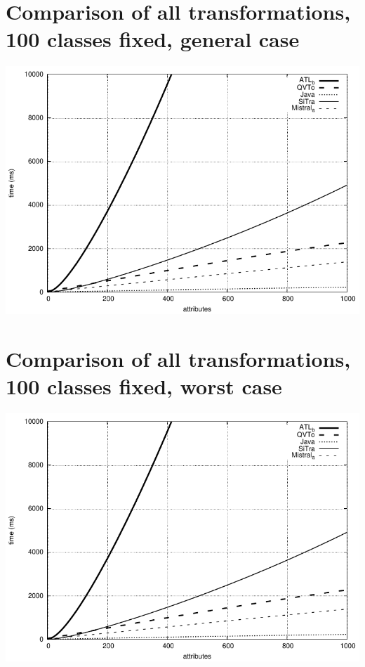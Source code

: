 \documentclass[a4paper,final]{article}
\begin{document}
\section*{Comparison of all transformations, 100 classes fixed, general case}
\includegraphics[width=\textwidth]{100classes_compared_general}

\section*{Comparison of all transformations, 100 classes fixed, worst case}
\includegraphics[width=\textwidth]{100classes_compared_general}
\end{document}
